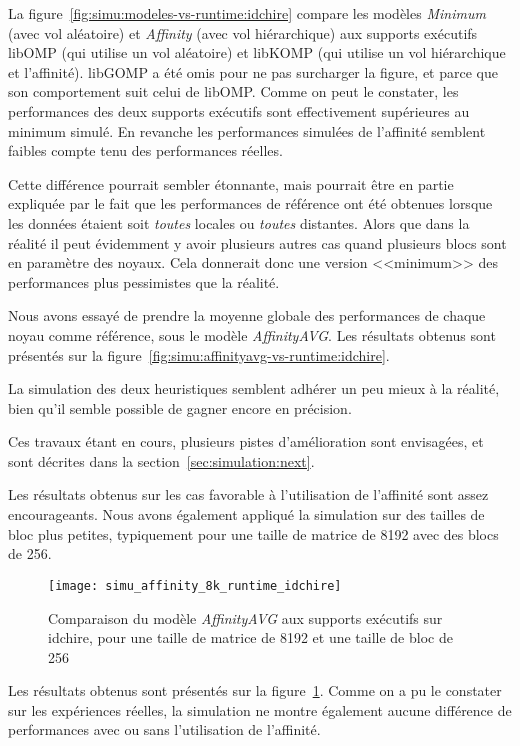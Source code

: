 La figure~\ref{fig:simu:modeles-vs-runtime:idchire} compare les modèles \emph{Minimum} (avec vol aléatoire) et \emph{Affinity} (avec vol hiérarchique) aux supports exécutifs libOMP (qui utilise un vol aléatoire) et libKOMP (qui utilise un vol hiérarchique et l'affinité). libGOMP a été omis pour ne pas surcharger la figure, et parce que son comportement suit celui de libOMP.
Comme on peut le constater, les performances des deux supports exécutifs sont effectivement supérieures au minimum simulé. En revanche les performances simulées de l'affinité semblent faibles compte tenu des performances réelles.

Cette différence pourrait sembler étonnante, mais pourrait être en partie expliquée par le fait que les performances de référence ont été obtenues lorsque les données étaient soit \textit{toutes} locales ou \textit{toutes} distantes.
Alors que dans la réalité il peut évidemment y avoir plusieurs autres cas quand plusieurs blocs sont en paramètre des noyaux.
Cela donnerait donc une version <<minimum>> des performances plus pessimistes que la réalité.

Nous avons essayé de prendre la moyenne globale des performances de chaque noyau comme référence, sous le modèle \emph{AffinityAVG}.
Les résultats obtenus sont présentés sur la figure~\ref{fig:simu:affinityavg-vs-runtime:idchire}.

La simulation des deux heuristiques semblent adhérer un peu mieux à la réalité, bien qu'il semble possible de gagner encore en précision.

Ces travaux étant en cours, plusieurs pistes d'amélioration sont envisagées, et sont décrites dans la section~\ref{sec:simulation:next}.


Les résultats obtenus sur les cas favorable à l'utilisation de l'affinité sont assez encourageants.
Nous avons également appliqué la simulation sur des tailles de bloc plus petites, typiquement pour une taille de matrice de 8192 avec des blocs de 256.

\begin{figure}[h!]
  \centering
  \texttt{[image: simu\_affinity\_8k\_runtime\_idchire]}
  \caption{Comparaison du modèle \emph{AffinityAVG} aux supports exécutifs sur idchire, pour une taille de matrice de 8192 et une taille de bloc de 256}\label{fig:simu:affinityavg-8k-vs-runtime:idchire}
\end{figure}

Les résultats obtenus sont présentés sur la figure~\ref{fig:simu:affinityavg-8k-vs-runtime:idchire}.
Comme on a pu le constater sur les expériences réelles, la simulation ne montre également aucune différence de performances avec ou sans l'utilisation de l'affinité.

